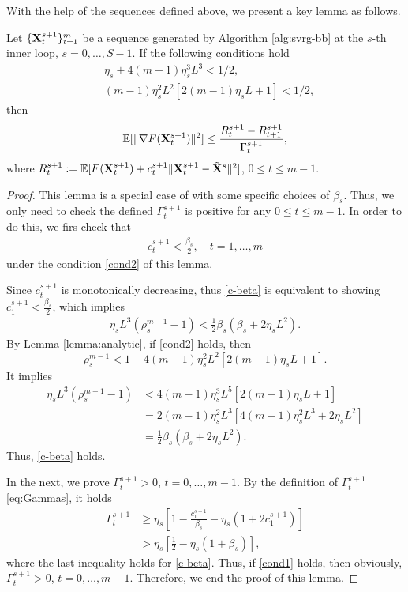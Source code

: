 \documentclass[./sbb_ordinal_embedding_aaai18.tex]{subfiles}%
\begin{document}
With the help of the sequences defined above, we present a key lemma as follows.
\begin{lemma}
\label{keylemma}
Let $\{{\bf X}_t^{s+1}\}_{t=1}^m$ be a sequence generated by Algorithm \ref{alg:svrg-bb} at the $s$-th inner loop, $s=0,\ldots, S-1$. If the following conditions hold
\begin{align}
& \eta_s + 4(m-1)\eta_s^3 L^3 < 1/2, \label{cond1}\\
& (m-1)\eta_s^2 L^2\left[ 2(m-1)\eta_s L +1\right] <1/2 \label{cond2},
\end{align}
then
\[
\mathbb{E}[\|\nabla F({\bf X}_t^{s+1})\|^2] \leq \frac{R_t^{s+1} - R_{t+1}^{s+1}}{\Gamma_t^{s+1}},
\]
where $R_t^{s+1}:= \mathbb{E}[F({\bf X}_t^{s+1}) + c_t^{s+1} \|{\bf X}_t^{s+1} - \tilde{\bf X}^s\|^2]$, $0\leq t \leq m-1.$
\end{lemma}
\begin{proof}
This lemma is a special case of \cite[Lemma 1]{pmlr-v48-reddi16} with some specific choices of $\beta_s$. Thus, we only need to check the defined $\Gamma_t^{s+1}$ is positive for any $0\leq t\leq m-1$. In order to do this, we firs check that
\begin{align}
\label{c-beta}
c_t^{s+1} < \frac{\beta_s}{2}, \quad t=1,\ldots,m
\end{align}
under the condition \eqref{cond2} of this lemma.


Since $c_t^{s+1}$ is monotonically decreasing, thus \eqref{c-beta} is equivalent to showing $c_1^{s+1} < \frac{\beta_s}{2}$, which implies
\begin{align}
\label{c-beta1}
\eta_sL^3(\rho_s^{m-1}-1) < \frac{1}{2}\beta_s(\beta_s + 2\eta_s L^2).
\end{align}
By Lemma \ref{lemma:analytic}, if \eqref{cond2} holds, then
\[
\rho_s^{m-1} < 1+4(m-1)\eta_s^2 L^2 \left[ 2(m-1)\eta_s L+1\right].
\]
It implies
\begin{align*}
\eta_s L^3 (\rho_s^{m-1}-1)
& < 4(m-1)\eta_s^3 L^5 \left[ 2(m-1)\eta_s L +1 \right]\\
& = 2(m-1)\eta_s^2 L^3 \left[ 4(m-1)\eta_s^2 L^3 + 2\eta_s L^2 \right]\\
& = \frac{1}{2}\beta_s (\beta_s + 2\eta_s L^2).
\end{align*}
Thus, \eqref{c-beta} holds.

In the next, we prove $\Gamma_t^{s+1}>0$, $t=0,\ldots, m-1$. By the definition of $\Gamma_t^{s+1}$ \eqref{eq:Gammas}, it holds
\begin{align*}
\Gamma_t^{s+1}
& \geq \eta_s \left[ 1 - \frac{c_1^{s+1}}{\beta_s} - \eta_s (1+2c_1^{s+1})\right]\\
&> \eta_s \left[ \frac{1}{2} - \eta_s (1+\beta_s)\right],
\end{align*}
where the last inequality holds for \eqref{c-beta}.
Thus, if \eqref{cond1} holds, then obviously, $\Gamma_t^{s+1}>0$, $t=0,\ldots,m-1.$
Therefore, we end the proof of this lemma.
\end{proof}
\end{document}
